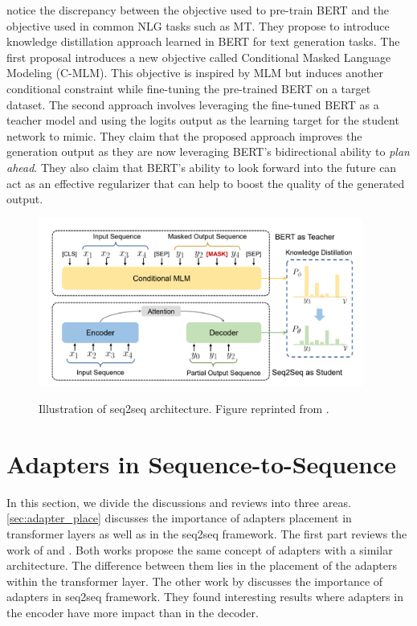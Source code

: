  notice the discrepancy between the objective used to pre-train BERT and the objective used in common NLG tasks such as MT. They propose to introduce knowledge distillation approach learned in BERT for text generation tasks. The first proposal introduces a new objective called Conditional Masked Language Modeling (C-MLM). This objective is inspired by MLM but induces another conditional constraint while fine-tuning the pre-trained BERT on a target dataset. The second approach involves leveraging the fine-tuned BERT as a teacher model and using the logits output as the learning target for the student network to mimic. They claim that the proposed approach improves the generation output as they are now leveraging BERT's bidirectional ability to \textit{plan ahead}. They also claim that BERT's ability to look forward into the future can act as an effective regularizer that can help to boost the quality of the generated output.

\begin{figure}[h]
    {\includegraphics[width=0.95\textwidth]{img/bert_distill.png}}
    \centering
    \caption{Illustration of seq2seq architecture. Figure reprinted from .}
    \label{img:bert_distill}
\end{figure}

\section{Adapters in Sequence-to-Sequence}
\label{sec:adapter_seq}

In this section, we divide the discussions and reviews into three areas. \cref{sec:adapter_place} discusses the importance of adapters placement in transformer layers as well as in the seq2seq framework. The first part reviews the work of  and . Both works propose the same concept of adapters with a similar architecture. The difference between them lies in the placement of the adapters within the transformer layer. The other work by  discusses the importance of adapters in seq2seq framework. They found interesting results where adapters in the encoder have more impact than in the decoder.

